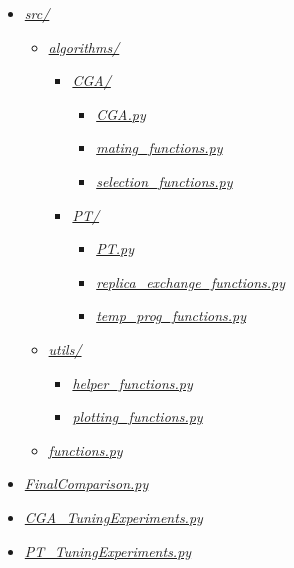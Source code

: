 \documentclass[10pt]{article}
\begin{document}
\begin{itemize}
    \footnotesize
    \item[] \href{#sec:algorithms}{\textit{src/}}
    \begin{itemize}
        \item[] \href{#sec:CGA}{\textit{algorithms/}}
        \begin{itemize}
            \item[] \href{#sec:CGA}{\textit{CGA/}}
            \begin{itemize}
                \item[] \href{#CGApy}{\textit{CGA.py}}
                \item[] \href{#mating_functionspy}{\textit{mating\_functions.py}}
                \item[] \href{#selection_functionspy}{\textit{selection\_functions.py}}
            \end{itemize}
            \item[] \href{#sec:PT}{\textit{PT/}}
            \begin{itemize}
                \item[] \href{#PTpy}{\textit{PT.py}}
                \item[] \href{#replica_exchange_functionspy}{\textit{replica\_exchange\_functions.py}}
                \item[] \href{#temp_prog_functionspy}{\textit{temp\_prog\_functions.py}}
            \end{itemize}
        \end{itemize}
        \item[] \href{#sec:utils}{\textit{utils/}}
        \begin{itemize}
            \item[] \href{#helper_functionspy}{\textit{helper\_functions.py}}
            \item[] \href{#plotting_functionspy}{\textit{plotting\_functions.py}}
        \end{itemize}
        \item[] \href{#functions.py}{\textit{functions.py}}
    \end{itemize}
    \item[] \href{#FinalComparison.py}{\textit{FinalComparison.py}}
    \item[] \href{#CGA_TuningExperiments.py}{\textit{CGA\_TuningExperiments.py}}
    \item[] \href{#PT_TuningExperiments.py}{\textit{PT\_TuningExperiments.py}}
\end{itemize}
\end{document}
